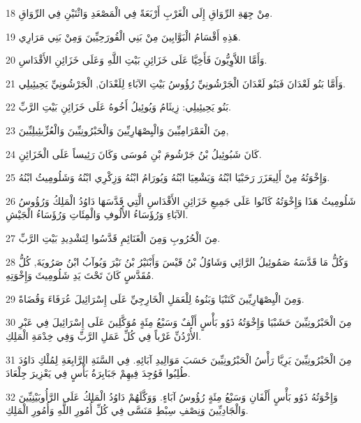\par 18 مِنْ جِهَةِ الرِّوَاقِ إِلَى الْغَرْبِ أَرْبَعَةً فِي الْمَصْعَدِ وَاثْنَيْنِ فِي الرِّوَاقِ.
\par 19 هَذِهِ أَقْسَامُ الْبَوَّابِينَ مِنْ بَنِي الْقُورَحِيِّينَ وَمِنْ بَنِي مَرَارِي.
\par 20 وَأَمَّا اللاَّوِيُّونَ فَأَخِيَّا عَلَى خَزَائِنِ بَيْتِ اللَّهِ وَعَلَى خَزَائِنِ الأَقْدَاسِ.
\par 21 وَأَمَّا بَنُو لَعْدَانَ فَبَنُو لَعْدَانَ الْجَرْشُونِيِّ رُؤُوسُ بَيْتِ الآبَاءِ لِلَعْدَانَ, الْجَرْشُونِيِّ يَحِيئِيلِي.
\par 22 بَنُو يَحِيئِيلِي: زِيثَامُ وَيُوئِيلُ أَخُوهُ عَلَى خَزَائِنِ بَيْتِ الرَّبِّ.
\par 23 مِنَ الْعَمْرَامِيِّينَ وَالْيِصْهَارِيِّينَ وَالْحَبْرُونِيِّينَ وَالْعُزِّيئِيلِيِّينَ,
\par 24 كَانَ شَبُوئِيلُ بْنُ جَرْشُومَ بْنِ مُوسَى وَكَانَ رَئِيساً عَلَى الْخَزَائِنِ.
\par 25 وَإِخْوَتُهُ مِنْ أَلِيعَزَرَ رَحَبْيَا ابْنُهُ وَيَشْعِيَا ابْنُهُ وَيُورَامُ ابْنُهُ وَزِكْرِي ابْنُهُ وَشَلُومِيثُ ابْنُهُ.
\par 26 شَلُومِيثُ هَذَا وَإِخْوَتُهُ كَانُوا عَلَى جَمِيعِ خَزَائِنِ الأَقْدَاسِ الَّتِي قَدَّسَهَا دَاوُدُ الْمَلِكُ وَرُؤُوسُ الآبَاءِ وَرُؤَسَاءُ الأُلُوفِ وَالْمِئَاتِ وَرُؤَسَاءُ الْجَيْشِ.
\par 27 مِنَ الْحُرُوبِ وَمِنَ الْغَنَائِمِ قَدَّسُوا لِتَشْدِيدِ بَيْتِ الرَّبِّ.
\par 28 وَكُلُّ مَا قَدَّسَهُ صَمُوئِيلُ الرَّائِي وَشَاوُلُ بْنُ قَيْسَ وَأَبْنَيْرُ بْنُ نَيْرَ وَيُوآبُ ابْنُ صَرُويَةَ, كُلُّ مُقَدَّسٍ كَانَ تَحْتَ يَدِ شَلُومِيثَ وَإِخْوَتِهِ.
\par 29 وَمِنَ الْيِصْهَارِيِّينَ كَنَنْيَا وَبَنُوهُ لِلْعَمَلِ الْخَارِجِيِّ عَلَى إِسْرَائِيلَ عُرَفَاءَ وَقُضَاةً.
\par 30 مِنَ الْحَبْرُونِيِّينَ حَشَبْيَا وَإِخْوَتُهُ ذَوُو بَأْسٍ أَلْفٌ وَسَبْعُ مِئَةٍ مُوَكَّلِينَ عَلَى إِسْرَائِيلَ فِي عَبْرِ الأُرْدُنِّ غَرْباً فِي كُلِّ عَمَلِ الرَّبِّ وَفِي خِدْمَةِ الْمَلِكِ.
\par 31 مِنَ الْحَبْرُونِيِّينَ يَرِيَّا رَأْسُ الْحَبْرُونِيِّينَ حَسَبَ مَوَالِيدِ آبَائِهِ. فِي السَّنَةِ الرَّابِعَةِ لِمُلْكِ دَاوُدَ طُلِبُوا فَوُجِدَ فِيهِمْ جَبَابِرَةُ بَأْسٍ فِي يَعْزِيرَ جِلْعَادَ.
\par 32 وَإِخْوَتُهُ ذَوُو بَأْسٍ أَلْفَانِ وَسَبْعُ مِئَةٍ رُؤُوسُ آبَاءٍ. وَوَكَّلَهُمْ دَاوُدُ الْمَلِكُ عَلَى الرَّأُوبَيْنِيِّينَ وَالْجَادِيِّينَ وَنِصْفِ سِبْطِ مَنَسَّى فِي كُلِّ أُمُورِ اللَّهِ وَأُمُورِ الْمَلِكِ.

